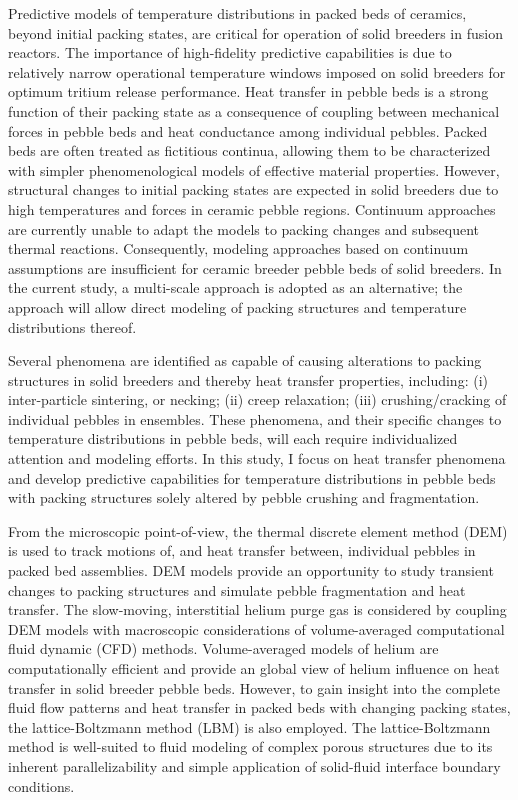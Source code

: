 Predictive models of temperature distributions in packed beds of ceramics, beyond initial packing states, are critical for operation of solid breeders in fusion reactors. The importance of high-fidelity predictive capabilities is due to relatively narrow operational temperature windows imposed on solid breeders for optimum tritium release performance. Heat transfer in pebble beds is a strong function of their packing state as a consequence of coupling between mechanical forces in pebble beds and heat conductance among individual pebbles. Packed beds are often treated as fictitious continua, allowing them to be characterized with simpler phenomenological models of effective material properties. However, structural changes to initial packing states are expected in solid breeders due to high temperatures and forces in ceramic pebble regions. Continuum approaches are currently unable to adapt the models to packing changes and subsequent thermal reactions. Consequently, modeling approaches based on continuum assumptions are insufficient for ceramic breeder pebble beds of solid breeders. In the current study, a multi-scale approach is adopted as an alternative; the approach will allow direct modeling of packing structures and temperature distributions thereof.

Several phenomena are identified as capable of causing alterations to packing structures in solid breeders and thereby heat transfer properties, including: (i) inter-particle sintering, or necking; (ii) creep relaxation; (iii) crushing/cracking of individual pebbles in ensembles. These phenomena, and their specific changes to temperature distributions in pebble beds, will each require individualized attention and modeling efforts. In this study, I focus on heat transfer phenomena and develop predictive capabilities for temperature distributions in pebble beds with packing structures solely altered by pebble crushing and fragmentation.

From the microscopic point-of-view, the thermal discrete element method (DEM) is used to track motions of, and heat transfer between, individual pebbles in packed bed assemblies. DEM models provide an opportunity to study transient changes to packing structures and simulate pebble fragmentation and heat transfer. The slow-moving, interstitial helium purge gas is considered by coupling DEM models with macroscopic considerations of volume-averaged computational fluid dynamic (CFD) methods. Volume-averaged models of helium are computationally efficient and provide an global view of helium influence on heat transfer in solid breeder pebble beds. However, to gain insight into the complete fluid flow patterns and heat transfer in packed beds with changing packing states, the lattice-Boltzmann method (LBM) is also employed. The lattice-Boltzmann method is well-suited to fluid modeling of complex porous structures due to its inherent parallelizability and simple application of solid-fluid interface boundary conditions. 

